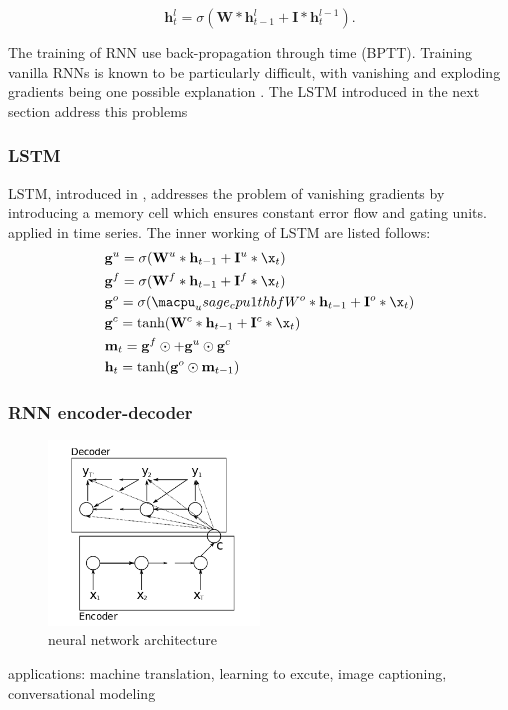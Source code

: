 \documentclass[5p]{elsarticle}
\begin{document}
\begin{equation}
	\mathbf h_t^{l} = \sigma(\mathbf W * \mathbf h_{t-1}^{l} + \mathbf I * \mathbf h_t^{l-1}).
\end{equation}

The training of RNN use back-propagation through time (BPTT). Training vanilla RNNs is known to be particularly difficult, with vanishing and exploding gradients being one possible explanation \cite{pascanu2012difficulty}. The LSTM introduced in the next section address this problems

\subsubsection{LSTM}
LSTM, introduced in \cite{Hochreiter1997LongMemory}, addresses the problem of vanishing gradients by introducing a memory cell which ensures constant error flow and gating units. \cite{MalhotraLongSeries} applied in time series. The inner working of LSTM are listed follows:
\begin{equation}
	\begin{split}
		& \mathbf g^u = \sigma(\mathbf W^u * \mathbf h_{t-1} + \mathbf I^u * \x_t) \\
		& \mathbf g^f = \sigma(\mathbf W^f * \mathbf h_{t-1} + \mathbf I^f * \x_t) \\
		& \mathbf g^o = \sigma(\macpu_usage_cpu1thbf W^o * \mathbf h_{t-1} + \mathbf I^o * \x_t) \\
		& \mathbf g^c = \tanh(\mathbf W^c * \mathbf h_{t-1} + \mathbf I^c * \x_t) \\
		& \mathbf m_t = \mathbf g^f \odot \mathbf +  \mathbf g^u \odot \mathbf g^c \\
		& \mathbf h_t = \tanh(\mathbf g^o \odot \mathbf m_{t-1})
	\end{split}
\end{equation}

\subsubsection{RNN encoder-decoder}
\cite{ChoLearningTranslation}
\begin{figure}[h]
    \centering
    \includegraphics[width=0.5\textwidth]{RNN_encoder-decoder.png}
    \caption{neural network architecture}
    \label{fig:RNN_encoder-decoder}
\end{figure}
applications: machine translation, learning to excute, image captioning, conversational modeling
\end{document}
